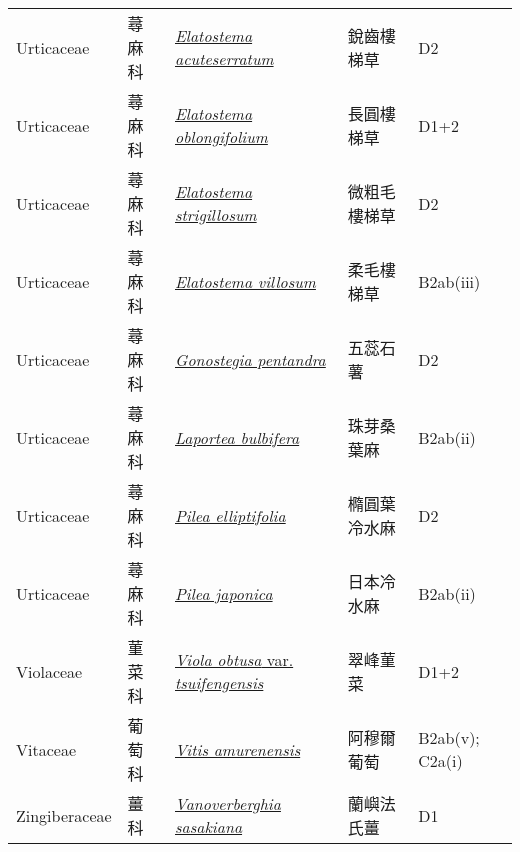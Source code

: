 {\begin{longtable}{p{2.5cm}p{2cm}p{5cm}p{2.5cm}p{3cm}}
    Urticaceae & 蕁麻科 & \href{http://www.theplantlist.org/tpl1.1/search?q=Elatostema+acuteserratum}{\textit{Elatostema acuteserratum} } & 銳齒樓梯草 & D2 \index{Elatostema@\textit{Elatostema}!acuteserratum@\textit{acuteserratum}}  \index{銳齒樓梯草} \\
    Urticaceae & 蕁麻科 & \href{http://www.theplantlist.org/tpl1.1/search?q=Elatostema+oblongifolium}{\textit{Elatostema oblongifolium} } & 長圓樓梯草 & D1+2 \index{Elatostema@\textit{Elatostema}!oblongifolium@\textit{oblongifolium}}  \index{長圓樓梯草} \\
    Urticaceae & 蕁麻科 & \href{http://www.theplantlist.org/tpl1.1/search?q=Elatostema+strigillosum}{\textit{Elatostema strigillosum} } & 微粗毛樓梯草 & D2 \index{Elatostema@\textit{Elatostema}!strigillosum@\textit{strigillosum}}  \index{微粗毛樓梯草} \\
    Urticaceae & 蕁麻科 & \href{http://www.theplantlist.org/tpl1.1/search?q=Elatostema+villosum}{\textit{Elatostema villosum} } & 柔毛樓梯草 & B2ab(iii) \index{Elatostema@\textit{Elatostema}!villosum@\textit{villosum}}  \index{柔毛樓梯草} \\
    Urticaceae & 蕁麻科 & \href{http://www.theplantlist.org/tpl1.1/search?q=Gonostegia+pentandra}{\textit{Gonostegia pentandra} } & 五蕊石薯 & D2 \index{Gonostegia@\textit{Gonostegia}!pentandra@\textit{pentandra}}  \index{五蕊石薯} \\
    Urticaceae & 蕁麻科 & \href{http://www.theplantlist.org/tpl1.1/search?q=Laportea+bulbifera}{\textit{Laportea bulbifera} } & 珠芽桑葉麻 & B2ab(ii) \index{Laportea@\textit{Laportea}!bulbifera@\textit{bulbifera}}  \index{珠芽桑葉麻} \\
    Urticaceae & 蕁麻科 & \href{http://www.theplantlist.org/tpl1.1/search?q=Pilea+elliptifolia}{\textit{Pilea elliptifolia} } & 橢圓葉冷水麻 & D2 \index{Pilea@\textit{Pilea}!elliptifolia@\textit{elliptifolia}}  \index{橢圓葉冷水麻} \\
    Urticaceae & 蕁麻科 & \href{http://www.theplantlist.org/tpl1.1/search?q=Pilea+japonica}{\textit{Pilea japonica} } & 日本冷水麻 & B2ab(ii) \index{Pilea@\textit{Pilea}!japonica@\textit{japonica}}  \index{日本冷水麻} \\
    Violaceae & 菫菜科 & \href{http://www.theplantlist.org/tpl1.1/search?q=Viola+obtusa+var.+tsuifengensis}{\textit{Viola obtusa} var. \textit{tsuifengensis} } & 翠峰菫菜 & D1+2 \index{Viola@\textit{Viola}!obtusa@\textit{obtusa}!var. tsuifengensis@var. \textit{tsuifengensis}}  \index{翠峰菫菜} \\
    Vitaceae & 葡萄科 & \href{http://www.theplantlist.org/tpl1.1/search?q=Vitis+amurenensis}{\textit{Vitis amurenensis} } & 阿穆爾葡萄 & B2ab(v); C2a(i) \index{Vitis@\textit{Vitis}!amurenensis@\textit{amurenensis}}  \index{阿穆爾葡萄} \\
    Zingiberaceae & 薑科 & \href{http://www.theplantlist.org/tpl1.1/search?q=Vanoverberghia+sasakiana}{\textit{Vanoverberghia sasakiana} } & 蘭嶼法氏薑 & D1 \index{Vanoverberghia@\textit{Vanoverberghia}!sasakiana@\textit{sasakiana}}  \index{蘭嶼法氏薑} \\
    \bottomrule
        \end{longtable}
        }
    